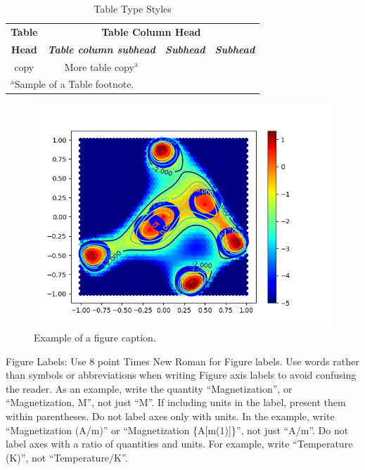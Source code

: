 \documentclass[conference]{IEEEtran}
\begin{document}
\begin{table}[htbp]
\caption{Table Type Styles}
\begin{center}
\begin{tabular}{|c|c|c|c|}
\hline
\textbf{Table}&\multicolumn{3}{|c|}{\textbf{Table Column Head}} \\
\cline{2-4} 
\textbf{Head} & \textbf{\textit{Table column subhead}}& \textbf{\textit{Subhead}}& \textbf{\textit{Subhead}} \\
\hline
copy& More table copy$^{\mathrm{a}}$& &  \\
\hline
\multicolumn{4}{l}{$^{\mathrm{a}}$Sample of a Table footnote.}
\end{tabular}
\label{tab2}
\end{center}
\end{table}

\begin{figure}[htbp]
\centerline{\includegraphics[scale=0.5]{fig1}}
\caption{Example of a figure caption.}
\label{fig}
\end{figure}

Figure Labels: Use 8 point Times New Roman for Figure labels. Use words 
rather than symbols or abbreviations when writing Figure axis labels to 
avoid confusing the reader. As an example, write the quantity 
``Magnetization'', or ``Magnetization, M'', not just ``M''. If including 
units in the label, present them within parentheses. Do not label axes only 
with units. In the example, write ``Magnetization (A/m)'' or ``Magnetization 
\{A[m(1)]\}'', not just ``A/m''. Do not label axes with a ratio of 
quantities and units. For example, write ``Temperature (K)'', not 
``Temperature/K''.
\end{document}
